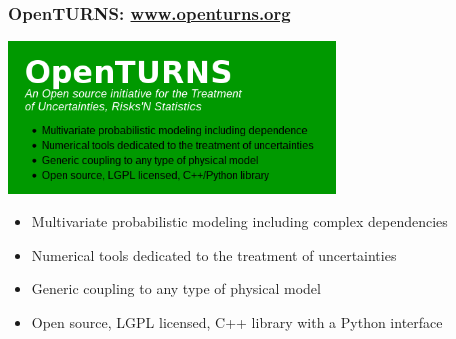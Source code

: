 \documentclass[aspectratio=169]{beamer}
\begin{document}
\begin{frame}
\frametitle{OpenTURNS: \url{www.openturns.org}}


    \begin{center}
    \includegraphics[width=0.65\textwidth]{figures/OT.png}
    \end{center}
	
\begin{itemize}
\item Multivariate probabilistic modeling including complex dependencies
\item Numerical tools dedicated to the treatment of uncertainties
\item Generic coupling to any type of physical model
\item Open source, LGPL licensed, C++ library with a Python interface
\end{itemize}


\end{frame}

\end{document}
